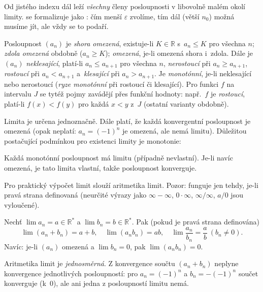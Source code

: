 \documentclass[11pt,a4paper]{article}
\begin{document}
\begin{intuice}
Od jistého indexu dál leží \emph{všechny} členy posloupnosti v libovolně malém okolí limity.  se formalizuje jako : čím menší $\varepsilon$ zvolíme, tím dál (větší $n_0$) možná musíme jít, ale vždy se to podaří.
\end{intuice}

\begin{definice}
Posloupnost $(a_n)$ je \emph{shora omezená}, existuje-li $K\in\mathbb{R}$ s~$a_n\le K$ pro všechna $n$; \emph{zdola omezená} obdobně ($a_n\ge K$); \emph{omezená}, je-li omezená shora i~zdola. Dále je $(a_n)$ \emph{neklesající}, platí-li $a_n\le a_{n+1}$ pro všechna $n$, \emph{nerostoucí} při $a_n\ge a_{n+1}$, \emph{rostoucí} při $a_n<a_{n+1}$ a~\emph{klesající} při $a_n>a_{n+1}$. Je \emph{monotónní}, je-li neklesající nebo nerostoucí (\emph{ryze monotónní} při rostoucí či klesající). Pro funkci $f$ na intervalu $J$ se tytéž pojmy zavádějí přes funkční hodnoty: např.\ $f$ je \emph{rostoucí}, platí-li $f(x)<f(y)$ pro každá $x<y$ z~$J$ (ostatní varianty obdobně).
\end{definice}

Limita je určena jednoznačně. Dále platí, že každá konvergentní posloupnost je omezená (opak neplatí: $a_n=(-1)^n$ je omezená, ale nemá limitu). Důležitou postačující podmínkou pro existenci limity je monotonie:

\begin{veta}
Každá monotónní posloupnost má limitu (případně nevlastní). Je-li navíc omezená, je tato limita vlastní, takže posloupnost konverguje.
\end{veta}

Pro praktický výpočet limit slouží aritmetika limit. Pozor: funguje jen tehdy, je-li pravá strana definovaná (neurčité výrazy jako $\infty-\infty$, $0\cdot\infty$, $\infty/\infty$, $a/0$ jsou vyloučené).

\begin{veta}
Nechť $\lim a_n=a\in\mathbb{R}^*$ a $\lim b_n=b\in\mathbb{R}^*$. Pak (pokud je pravá strana definována)
\[
  \lim(a_n+b_n)=a+b,\quad \lim(a_n b_n)=a b,\quad \lim\frac{a_n}{b_n}=\frac{a}{b}\ (b_n\neq0).
\]
Navíc: je-li $(a_n)$ omezená a $\lim b_n=0$, pak $\lim(a_n b_n)=0$.
\end{veta}

\begin{poznamka}
Aritmetika limit je \emph{jednosměrná}. Z konvergence součtu $(a_n+b_n)$ neplyne konvergence jednotlivých posloupností: pro $a_n=(-1)^n$ a $b_n=-(-1)^n$ součet konverguje (k~0), ale ani jedna z posloupností limitu nemá.
\end{poznamka}
\end{document}
